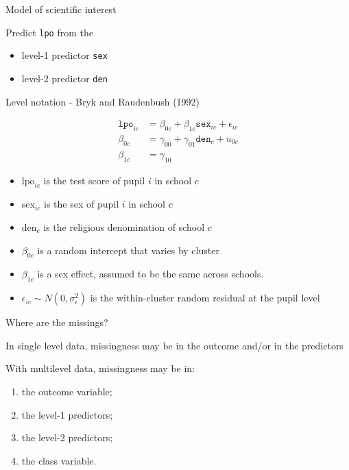 \documentclass[ignorenonframetext,aspectratio=43]{beamer}
\providecommand{\tightlist}{%
  \setlength{\itemsep}{0pt}\setlength{\parskip}{0pt}}
\begin{document}
\begin{frame}[fragile]{Model of scientific interest}

Predict \texttt{lpo} from the

\begin{itemize}
\tightlist
\item
  level-1 predictor \texttt{sex}
\item
  level-2 predictor \texttt{den}
\end{itemize}

\end{frame}

\begin{frame}{Level notation - Bryk and Raudenbush (1992)}

\begin{align}
{{\texttt{lpo}}}_{ic} & = \beta_{0c} + \beta_{1c}{{\texttt{sex}}}_{ic} + \epsilon_{ic}\\
\beta_{0c}     & = \gamma_{00} + \gamma_{01}{{\texttt{den}}}_{c} + u_{0c}\\
\beta_{1c}     & = \gamma_{10}
\end{align}

\begin{itemize}
\tightlist
\item
  \(\text{lpo}_{ic}\) is the test score of pupil \(i\) in school \(c\)
\item
  \(\text{sex}_{ic}\) is the sex of pupil \(i\) in school \(c\)
\item
  \(\text{den}_c\) is the religious denomination of school \(c\)
\item
  \(\beta_{0c}\) is a random intercept that varies by cluster
\item
  \(\beta_{1c}\) is a sex effect, assumed to be the same across schools.
\item
  \(\epsilon_{ic} \sim N(0, \sigma_\epsilon^2)\) is the within-cluster
  random residual at the pupil level
\end{itemize}

\end{frame}

\begin{frame}{Where are the missings?}

In single level data, missingness may be in the outcome and/or in the
predictors

With multilevel data, missingness may be in:

\begin{enumerate}
\def\labelenumi{\arabic{enumi}.}
\item
  the outcome variable;
\item
  the level-1 predictors;
\item
  the level-2 predictors;
\item
  the class variable.
\end{enumerate}

\end{frame}
\end{document}
